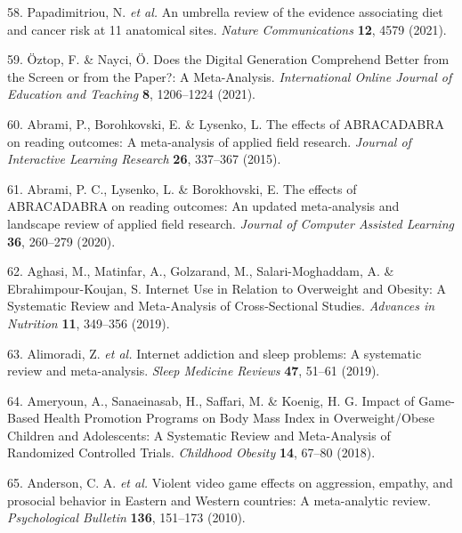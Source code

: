\documentclass[
  english,
  man]{apa6}
\newenvironment{cslreferences}%
  {}%
  {\par}
\begin{document}
\begin{cslreferences}
\leavevmode\hypertarget{ref-papadimitriouUmbrellaReviewEvidence2021}{}%
58. Papadimitriou, N. \emph{et al.} An umbrella review of the evidence associating diet and cancer risk at 11 anatomical sites. \emph{Nature Communications} \textbf{12}, 4579 (2021).

\leavevmode\hypertarget{ref-oztopDoesDigitalGeneration2021}{}%
59. Öztop, F. \& Nayci, Ö. Does the Digital Generation Comprehend Better from the Screen or from the Paper?: A Meta-Analysis. \emph{International Online Journal of Education and Teaching} \textbf{8}, 1206--1224 (2021).

\leavevmode\hypertarget{ref-abramiEffectsABRACADABRAReading2015}{}%
60. Abrami, P., Borohkovski, E. \& Lysenko, L. The effects of ABRACADABRA on reading outcomes: A meta-analysis of applied field research. \emph{Journal of Interactive Learning Research} \textbf{26}, 337--367 (2015).

\leavevmode\hypertarget{ref-abramiEffectsABRACADABRAReading2020}{}%
61. Abrami, P. C., Lysenko, L. \& Borokhovski, E. The effects of ABRACADABRA on reading outcomes: An updated meta-analysis and landscape review of applied field research. \emph{Journal of Computer Assisted Learning} \textbf{36}, 260--279 (2020).

\leavevmode\hypertarget{ref-aghasiInternetUseRelation2019}{}%
62. Aghasi, M., Matinfar, A., Golzarand, M., Salari-Moghaddam, A. \& Ebrahimpour-Koujan, S. Internet Use in Relation to Overweight and Obesity: A Systematic Review and Meta-Analysis of Cross-Sectional Studies. \emph{Advances in Nutrition} \textbf{11}, 349--356 (2019).

\leavevmode\hypertarget{ref-alimoradiInternetAddictionSleep2019}{}%
63. Alimoradi, Z. \emph{et al.} Internet addiction and sleep problems: A systematic review and meta-analysis. \emph{Sleep Medicine Reviews} \textbf{47}, 51--61 (2019).

\leavevmode\hypertarget{ref-ameryounImpactGameBasedHealth2018}{}%
64. Ameryoun, A., Sanaeinasab, H., Saffari, M. \& Koenig, H. G. Impact of Game-Based Health Promotion Programs on Body Mass Index in Overweight/Obese Children and Adolescents: A Systematic Review and Meta-Analysis of Randomized Controlled Trials. \emph{Childhood Obesity} \textbf{14}, 67--80 (2018).

\leavevmode\hypertarget{ref-andersonViolentVideoGame2010}{}%
65. Anderson, C. A. \emph{et al.} Violent video game effects on aggression, empathy, and prosocial behavior in Eastern and Western countries: A meta-analytic review. \emph{Psychological Bulletin} \textbf{136}, 151--173 (2010).


\end{cslreferences}
\end{document}
